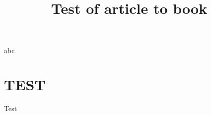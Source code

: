 \documentclass{article}
\title{Test of article to book}
\begin{document}
    \maketitle
    
    
    
    abc
    \section{TEST}
    Test
\end{document}
